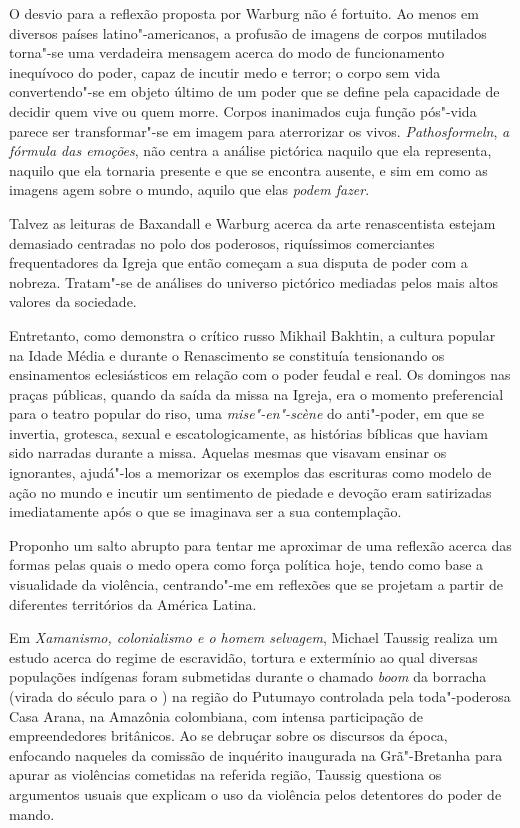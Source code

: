 O desvio para a reflexão proposta por Warburg não é fortuito. Ao menos
em diversos países latino"-americanos, a profusão de imagens de corpos
mutilados torna"-se uma verdadeira mensagem acerca do modo de
funcionamento inequívoco do poder, capaz de incutir medo e terror; o
corpo sem vida convertendo"-se em objeto último de um poder que se define
pela capacidade de decidir quem vive ou quem morre. Corpos inanimados
cuja função pós"-vida parece ser transformar"-se em imagem para
aterrorizar os vivos. \emph{Pathosformeln}, \emph{a fórmula das
emoções}, não centra a análise pictórica naquilo que ela representa,
naquilo que ela tornaria presente e que se encontra ausente, e sim em
como as imagens agem sobre o mundo, aquilo que elas \emph{podem fazer}.

\asterisc

Talvez as leituras de Baxandall e Warburg acerca da arte renascentista
estejam demasiado centradas no polo dos poderosos, riquíssimos
comerciantes frequentadores da Igreja que então começam a sua disputa de
poder com a nobreza. Tratam"-se de análises do universo pictórico
mediadas pelos mais altos valores da sociedade.

Entretanto, como demonstra o crítico russo Mikhail Bakhtin, a cultura
popular na Idade Média e durante o Renascimento se constituía
tensionando os ensinamentos eclesiásticos em relação com o poder feudal
e real. Os domingos nas praças públicas, quando da saída da missa na
Igreja, era o momento preferencial para o teatro popular do riso, uma
\emph{mise"-en"-scène} do anti"-poder, em que se invertia, grotesca, sexual e
escatologicamente, as histórias bíblicas que haviam sido narradas
durante a missa. Aquelas mesmas que visavam ensinar os ignorantes,
ajudá"-los a memorizar os exemplos das escrituras como modelo de ação no
mundo e incutir um sentimento de piedade e devoção eram satirizadas
imediatamente após o que se imaginava ser a sua contemplação.

\asterisc

Proponho um salto abrupto para tentar me aproximar de uma reflexão
acerca das formas pelas quais o medo opera como força política hoje,
tendo como base a visualidade da violência, centrando"-me em reflexões
que se projetam a partir de diferentes territórios da América Latina.

Em \emph{Xamanismo, colonialismo e o homem selvagem}, Michael Taussig
realiza um estudo acerca do regime de escravidão, tortura e extermínio
ao qual diversas populações indígenas foram submetidas durante o chamado
\emph{boom} da borracha (virada do século  para o ) na região do
Putumayo controlada pela toda"-poderosa Casa Arana, na Amazônia
colombiana, com intensa participação de empreendedores britânicos. Ao se
debruçar sobre os discursos da época, enfocando naqueles da comissão de
inquérito inaugurada na Grã"-Bretanha para apurar as violências cometidas
na referida região, Taussig questiona os argumentos usuais que explicam
o uso da violência pelos detentores do poder de mando.


